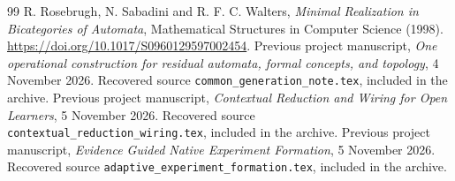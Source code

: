 \documentclass[11pt]{article}
\theoremstyle{definition}\newtheorem{definition}[theorem]{Definition}
\theoremstyle{remark}\newtheorem{remark}[theorem]{Remark}
\begin{document}
\begin{thebibliography}{99}
 R. Rosebrugh, N. Sabadini and R. F. C. Walters,
\emph{Minimal Realization in Bicategories of Automata},
Mathematical Structures in Computer Science (1998).
\url{https://doi.org/10.1017/S0960129597002454}.
 Previous project manuscript,
\emph{One operational construction for residual automata, formal concepts,
and topology}, 4 November 2026.
Recovered source \texttt{common\_generation\_note.tex}, included in the archive.
 Previous project manuscript,
\emph{Contextual Reduction and Wiring for Open Learners}, 5 November 2026.
Recovered source \texttt{contextual\_reduction\_wiring.tex}, included in the archive.
 Previous project manuscript,
\emph{Evidence Guided Native Experiment Formation}, 5 November 2026.
Recovered source \texttt{adaptive\_experiment\_formation.tex}, included in the archive.
\end{thebibliography}
\end{document}
